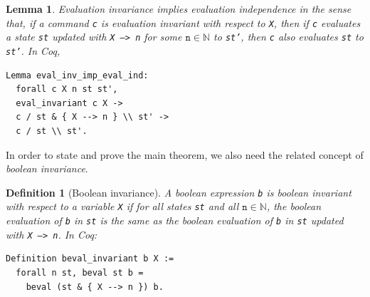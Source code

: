 \documentclass[compsoc,conference,a4paper,10pt,times]{IEEEtran}
\newtheorem{lemma}[theorem]{Lemma}
\newtheorem{defin}[theorem]{Definition}
\begin{document}
\begin{lemma}\label{independence}
Evaluation invariance implies evaluation independence in the sense that, if a command \texttt{c} is evaluation invariant with respect to \texttt{X}, then if \texttt{c} evaluates a state \texttt{st} updated with \texttt{X -->  n} for some $\mathtt{n} \in \mathbb{N}$ to \texttt{st'}, then \texttt{c} also evaluates \texttt{st} to \texttt{st'}.  In Coq,
\begin{verbatim}
Lemma eval_inv_imp_eval_ind: 
  forall c X n st st', 
  eval_invariant c X ->
  c / st & { X --> n } \\ st' -> 
  c / st \\ st'.
\end{verbatim}
\end{lemma}

In order to state and prove the main theorem, we also need the related concept of \emph{boolean invariance}.
\begin{defin}[Boolean invariance]
A boolean expression \texttt{b} is \emph{boolean invariant} with respect to a variable \texttt{X} if for all states \texttt{st} and all $\mathtt{n} \in \mathbb{N}$, the boolean evaluation of \texttt{b} in \texttt{st} is the same as the boolean evaluation of \texttt{b} in \texttt{st} updated with \texttt{X --> n}.
In Coq:
\begin{verbatim}
Definition beval_invariant b X :=
  forall n st, beval st b = 
    beval (st & { X --> n }) b. 
\end{verbatim}
\end{defin}
\end{document}
